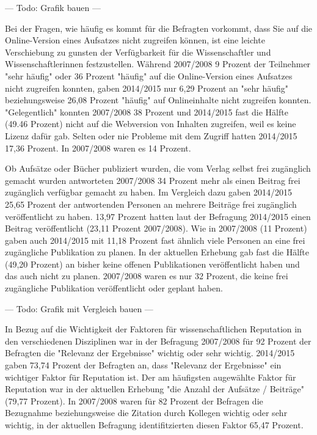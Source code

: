--- Todo: Grafik bauen ---

Bei der Fragen, wie häufig es kommt für die Befragten vorkommt, dass Sie auf die Online-Version eines Aufsatzes nicht zugreifen können, ist eine leichte Verschiebung zu gunsten der Verfügbarkeit für die Wissenschaftler und Wissenschaftlerinnen festzustellen. Während 2007/2008 9 Prozent der Teilnehmer "sehr häufig" oder 36 Prozent "häufig" auf die Online-Version eines Aufsatzes nicht zugreifen konnten, gaben 2014/2015 nur 6,29 Prozent an "sehr häufig" beziehungsweise 26,08 Prozent "häufig" auf Onlineinhalte nicht zugreifen konnten. "Gelegentlich" konnten 2007/2008 38 Prozent und 2014/2015 fast die Hälfte (49.46 Prozent) nicht auf die Webversion von Inhalten zugreifen, weil es keine Lizenz dafür gab. Selten oder nie Probleme mit dem Zugriff hatten 2014/2015 17,36 Prozent. In 2007/2008 waren es 14 Prozent.

Ob Aufsätze oder Bücher publiziert wurden, die vom Verlag selbst frei zugänglich gemacht wurden antworteten 2007/2008 34 Prozent mehr als einen Beitrag frei zugänglich verfügbar gemacht zu haben. Im Vergleich dazu gaben 2014/2015 25,65 Prozent der antwortenden Personen an mehrere Beiträge frei zugänglich veröffentlicht zu haben. 13,97 Prozent hatten laut der Befragung 2014/2015 einen Beitrag veröffentlicht (23,11 Prozent 2007/2008). Wie in 2007/2008 (11 Prozent) gaben auch 2014/2015 mit 11,18 Prozent fast ähnlich viele Personen an eine frei zugängliche Publikation zu planen. In der aktuellen Erhebung gab fast die Hälfte (49,20 Prozent) an bisher keine offenen Publikationen veröffentlicht haben und das auch nicht zu planen. 2007/2008 waren es nur 32 Prozent, die keine frei zugängliche Publikation veröffentlicht oder geplant haben.

--- Todo: Grafik mit Vergleich bauen ---

In Bezug auf die Wichtigkeit der Faktoren für wissenschaftlichen Reputation in den verschiedenen Disziplinen war in der Befragung 2007/2008 für 92 Prozent der Befragten die "Relevanz der Ergebnisse" wichtig oder sehr wichtig. 2014/2015 gaben 73,74 Prozent der Befragten an, dass "Relevanz der Ergebnisse" ein wichtiger Faktor für Reputation ist. Der am häufigsten augewählte Faktor für Reputation war in der aktuellen Erhebung "die Anzahl der Aufsätze / Beiträge" (79,77 Prozent). In 2007/2008 waren für 82 Prozent der Befragen die Bezugnahme beziehungsweise die Zitation durch Kollegen wichtig oder sehr wichtig, in der aktuellen Befragung identifitzierten diesen Faktor 65,47 Prozent.
